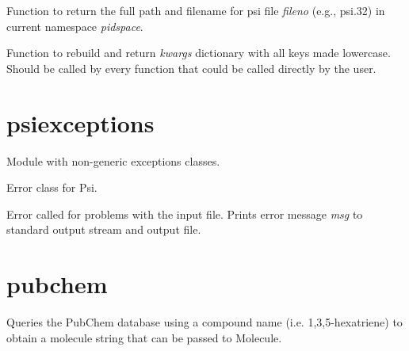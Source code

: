 \documentclass[letterpaper,10pt,english]{sphinxmanual}
\begin{document}
\begin{fulllineitems}
\label{index:procutil.get_psifile}
Function to return the full path and filename for psi file
\emph{fileno} (e.g., psi.32) in current namespace \emph{pidspace}.

\end{fulllineitems}


\begin{fulllineitems}
\label{index:procutil.kwargs_lower}
Function to rebuild and return \emph{kwargs} dictionary
with all keys made lowercase. Should be called by every
function that could be called directly by the user.

\end{fulllineitems}



\section{psiexceptions}
\label{index:module-psiexceptions}\label{index:psiexceptions}
Module with non-generic exceptions classes.

\begin{fulllineitems}
\label{index:psiexceptions.PsiException}
Error class for Psi.

\end{fulllineitems}


\begin{fulllineitems}
\label{index:psiexceptions.ValidationError}
Error called for problems with the input file. Prints
error message \emph{msg} to standard output stream and output file.

\end{fulllineitems}



\section{pubchem}
\label{index:pubchem}\label{index:module-pubchem}
Queries the PubChem database using a compound name (i.e. 1,3,5-hexatriene)
to obtain a molecule string that can be passed to Molecule.
\end{document}
